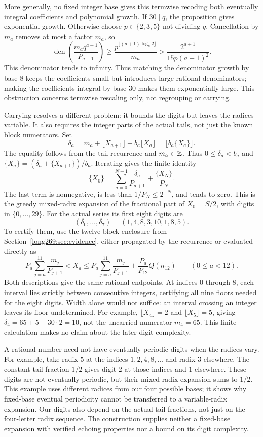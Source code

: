\documentclass[11pt]{article}
\theoremstyle{remark}
\theoremstyle{plain}
\begin{document}
More generally, no fixed integer base gives this termwise recoding both
eventually integral coefficients and polynomial growth.  If $30\mid q$,
the proposition gives exponential growth.  Otherwise choose
$p\in\{2,3,5\}$ not dividing $q$.  Cancellation by $m_a$ removes at most
a factor $m_a$, so
\[
 \operatorname{den}\!\left(\frac{m_aq^{a+1}}{P_{a+1}}\right)
 \ge\frac{p^{\lfloor(a+1)\log_p2\rfloor}}{m_a}
 >\frac{2^{a+1}}{15p(a+1)^2}.
\]
This denominator tends to infinity.  Thus matching the denominator growth by base $8$ keeps the coefficients
small but introduces large rational denominators; making the coefficients
integral by base $30$ makes them exponentially large. This obstruction
concerns termwise rescaling only, not regrouping or carrying.

Carrying resolves a different problem: it bounds the digits but leaves
the radices variable. It also requires the integer parts of the actual
tails, not just the known block numerators. Set
\[
 \delta_a=m_a+\lfloor X_{a+1}\rfloor-b_a\lfloor X_a\rfloor
          =\lfloor b_a\{X_a\}\rfloor.
\]
The equality follows from the tail recurrence and $m_a\in\mathbb{Z}$.  Thus
$0\le\delta_a<b_a$ and $\{X_a\}=(\delta_a+\{X_{a+1}\})/b_a$.
Iterating gives the finite identity
\[
 \{X_0\}=\sum_{a=0}^{N-1}\frac{\delta_a}{P_{a+1}}
              +\frac{\{X_N\}}{P_N}.
\]
The last term is nonnegative, is less than $1/P_N\le2^{-N}$, and tends
to zero.  This is the greedy mixed-radix expansion of the fractional part
of $X_0=S/2$, with digits in $\{0,\ldots,29\}$.
For the actual series its first eight digits are
\[
 (\delta_0,\ldots,\delta_7)=(1,4,8,3,10,1,8,5).
\]
To certify them, use the twelve-block enclosure from
Section~\ref{long269:sec:evidence}, either propagated by the recurrence
or evaluated directly as
\[
 P_a\sum_{j=a}^{11}\frac{m_j}{P_{j+1}}<X_a
 \le P_a\sum_{j=a}^{11}\frac{m_j}{P_{j+1}}
       +\frac{P_a}{P_{12}}Q(n_{12})\qquad(0\le a<12).
\]
Both descriptions give the same rational endpoints. At indices $0$
through $8$, each interval lies strictly between consecutive integers,
certifying all nine floors needed for the eight digits. Width alone
would not suffice: an interval crossing an integer leaves its floor
undetermined.  For example,
$\lfloor X_4\rfloor=2$ and $\lfloor X_5\rfloor=5$, giving
$\delta_4=65+5-30\cdot2=10$, not the uncarried numerator $m_4=65$.
This finite calculation makes no claim about the later digit complexity.

A rational number need not have eventually periodic digits when the radices vary.  For example,
take radix $5$ at the indices $1,2,4,8,\ldots$ and radix $3$ elsewhere.
The constant tail fraction $1/2$ gives digit $2$ at those indices and
$1$ elsewhere.  These digits are not eventually periodic, but their
mixed-radix expansion sums to $1/2$.  This example uses different radices
from our four possible bases; it shows why fixed-base eventual
periodicity cannot be transferred to a variable-radix expansion.  Our digits also
depend on the actual tail fractions, not just on the four-letter radix
sequence.  The construction supplies neither a fixed-base expansion
with verified echoing properties nor a bound on its digit complexity.
\end{document}
